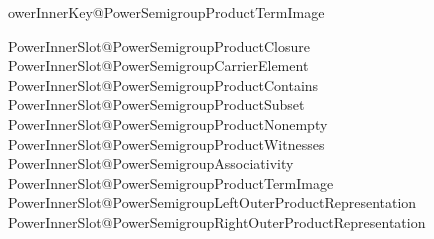 \expandafter\newcommand\csname PowerInnerKey@PowerSemigroupProductTermImage

\expandafter\def\csname PowerInnerSlot@PowerSemigroupProductClosure
\expandafter\def\csname PowerInnerSlot@PowerSemigroupCarrierElement
\expandafter\def\csname PowerInnerSlot@PowerSemigroupProductContains
\expandafter\def\csname PowerInnerSlot@PowerSemigroupProductSubset
\expandafter\def\csname PowerInnerSlot@PowerSemigroupProductNonempty
\expandafter\def\csname PowerInnerSlot@PowerSemigroupProductWitnesses
\expandafter\def\csname PowerInnerSlot@PowerSemigroupAssociativity
\expandafter\def\csname PowerInnerSlot@PowerSemigroupProductTermImage
\expandafter\def\csname PowerInnerSlot@PowerSemigroupLeftOuterProductRepresentation
\expandafter\def\csname PowerInnerSlot@PowerSemigroupRightOuterProductRepresentation
